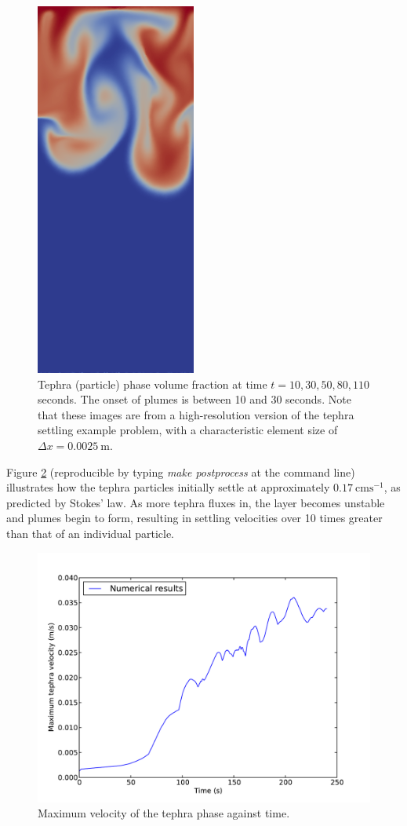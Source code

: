\begin{figure}[H]
	      \includegraphics[width=0.19\columnwidth]{./examples_images/tephra_settling/tephra_fine_5.png}
   \caption{Tephra (particle) phase volume fraction at time $t = 10, 30, 50, 80, 110$ seconds. The onset of plumes is between 10 and 30 seconds. Note that these images are from a high-resolution version of the tephra settling example problem, with a characteristic element size of $\Delta x = 0.0025\ \mathrm{m}$.}
   \label{fig:tephra_settling_fine}
\end{figure}

Figure \ref{fig:tephra_settling_velocity} (reproducible by typing \textit{make postprocess} at the command line) illustrates how the tephra particles initially settle at approximately $0.17\ \mathrm{cms^{-1}}$, as predicted by Stokes' law. As more tephra fluxes in, the layer becomes unstable and plumes begin to form, resulting in settling velocities over 10 times greater than that of an individual particle.

\begin{figure}[H]
	\centering
	      \includegraphics[width=0.8\columnwidth]{./examples_images/tephra_settling/tephra_velocity.pdf}
   \caption{Maximum velocity of the tephra phase against time.}
   \label{fig:tephra_settling_velocity}
\end{figure}

